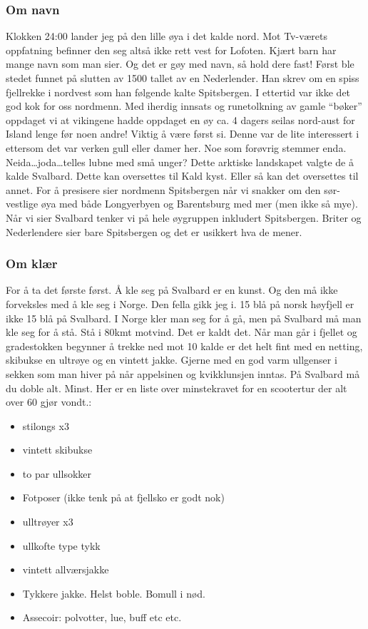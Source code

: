 \subsubsection{Om navn}
Klokken 24:00 lander jeg på den lille øya i det kalde nord. Mot
Tv-værets oppfatning befinner den seg altså ikke rett vest for
Lofoten.
Kjært barn har mange navn som man sier. Og det er gøy med navn,  så
hold dere fast! Først ble stedet funnet på slutten av 1500 tallet av
en Nederlender. Han skrev om en spiss fjellrekke i nordvest som han
følgende kalte Spitsbergen. I ettertid var ikke det god
kok for oss nordmenn. Med iherdig innsats og runetolkning av gamle
``bøker'' oppdaget vi at vikingene hadde oppdaget en øy ca. 4 dagers
seilas nord-aust for Island lenge før noen andre! Viktig å være først
si. Denne var de lite interessert i ettersom
det var verken gull eller damer her. Noe som forøvrig stemmer enda.
Neida\ldots joda\ldots telles lubne med små unger? 
Dette arktiske landskapet valgte de å kalde Svalbard. Dette kan
oversettes til Kald kyst. Eller så kan det oversettes til annet. For å
presisere sier
nordmenn Spitsbergen når vi snakker om den sør-vestlige øya med både
Longyerbyen og Barentsburg med mer (men ikke så mye). Når vi sier
Svalbard tenker vi på hele øygruppen inkludert Spitsbergen. Briter og
Nederlendere sier bare Spitsbergen og det er usikkert hva de mener.
\clearpage

\subsubsection*{Om klær}

For å ta det første først. Å kle seg på Svalbard er en kunst. Og den må ikke forveksles med å kle seg
i Norge. Den fella gikk jeg i. 15 blå på norsk høyfjell er ikke 15 blå
på Svalbard. I Norge kler man  seg for å gå, men på
Svalbard må man kle seg for å stå. Stå i 80kmt motvind. Det er kaldt
det. Når man går i fjellet og gradestokken begynner å trekke
ned mot 10 kalde er det helt fint med en netting, skibukse en ultrøye
og en vintett jakke. Gjerne med en god varm ullgenser i sekken som man
hiver på når appelsinen og kvikklunsjen inntas. På Svalbard må du
doble alt. Minst. Her er en liste over minstekravet for en scootertur
der alt over 60 gjør vondt.:

\begin{itemize}
		\item stilongs x3
		\item vintett skibukse
		\item to par ullsokker
		\item Fotposer (ikke tenk på at fjellsko er godt nok)
		\item ulltrøyer x3
		\item ullkofte type tykk
		\item vintett allværsjakke
		\item Tykkere jakke. Helst boble. Bomull i nød.
		\item Assecoir: polvotter, lue, buff etc etc.
\end{itemize}

